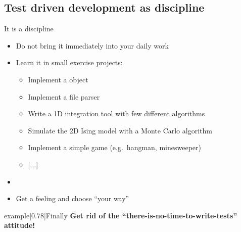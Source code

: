 
\subsection{Test driven development as discipline}
\begin{frame}{It is a discipline}
    \begin{itemize}
        \item \alert{Do not bring it immediately into your daily work}
        \item Learn it in small exercise projects:
        \begin{itemize}
            \item Implement a \;\; object
            \item Implement a file parser
            \item Write a 1D integration tool with few different algorithms
            \item Simulate the 2D Ising model with a Monte Carlo algorithm
            \item Implement a simple game (e.g.\ hangman, minesweeper)
            \item{} [...]
        \end{itemize}
        \item {}
        \item Get a feeling and choose ``your way''
    \end{itemize}
    \begin{varblock}{example}[0.78\textwidth]{Finally}
        \bfseries Get rid of the ``there-is-no-time-to-write-tests'' attitude!\\
    \end{varblock}
\end{frame}
